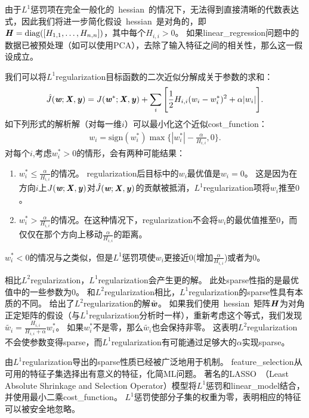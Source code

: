 由于$L^1$惩罚项在完全一般化的~\gls{hessian}~的情况下，无法得到直接清晰的代数表达式，因此我们将进一步简化假设~\gls{hessian}~是对角的，即$\boldsymbol{\mathit{H}} = \text{diag}([H_{1,1},\dots, H_{n,n}])$，其中每个$H_{i,i}>0$。
如果\gls{linear_regression}问题中的数据已被预处理（如可以使用PCA），去除了输入特征之间的相关性，那么这一假设成立。

我们可以将$L^1$\gls{regularization}目标函数的二次近似分解成关于参数的求和：
\begin{align}
 \hat J(\Vw; \MX, \Vy) = J(\Vw^*; \MX, \Vy) + \sum_i \Bigg [\frac{1}{2} H_{i,i} (w_i - w_i^*)^2 
 + \alpha |w_i| \Bigg].  %
\end{align}
如下列形式的解析解（对每一维$i$）可以最小化这个近似\gls{cost_function}：
\begin{align}
w_i = \text{sign}(w_i^*) \max\Big\{ |w_i^*| - \frac{\alpha}{H_{i,i}} , 0\Big\} .
\end{align}
对每个$i$,考虑$w_i^* > 0$的情形，会有两种可能结果：
\begin{enumerate}
\item $w_i^* \leq \frac{\alpha}{H_{i,i}}$的情况。
\gls{regularization}后目标中的$w_i$最优值是$w_i = 0$。
这是因为在方向$i$上$J(\boldsymbol{\mathit{w}}; \boldsymbol{\mathit{X}}, \boldsymbol{\mathit{y}}) $对$ \hat J(\boldsymbol{\mathit{w}}; \boldsymbol{\mathit{X}}, \boldsymbol{\mathit{y}})$的贡献被抵消，$L^1$\gls{regularization}项将$w_i$推至$0$。
\item  $w_i^* > \frac{\alpha}{H_{i,i}}$的情况。在这种情况下，\gls{regularization}不会将$w_i$的最优值推至0，而仅仅在那个方向上移动$\frac{\alpha}{H_{i,i}}$的距离。
\end{enumerate}
$w_i^* < 0$的情况与之类似，但是$L^1$惩罚项使$w_i$更接近0(增加$ \frac{\alpha}{H_{i,i}}$)或者为0。

相比$L^2$\gls{regularization}，$L^1$\gls{regularization}会产生更的解。
此处\gls{sparse}性指的是最优值中的一些参数为$0$。
和$L^2$\gls{regularization}相比，$L^1$\gls{regularization}的\gls{sparse}性具有本质的不同。
给出了$L^2$\gls{regularization}的解$\tilde {\boldsymbol{\mathit{w}}}$。 
如果我们使用~\gls{hessian}~矩阵$\boldsymbol{\mathit{H}}$为对角正定矩阵的假设（与$L^1$\gls{regularization}分析时一样），重新考虑这个等式，我们发现
$\tilde{w_i} = \frac{H_{i,i}}{H_{i,i} + \alpha} w_i^*$。
如果$w_i^*$不是零，那么$\tilde{w_i}$也会保持非零。 
这表明$L^2$\gls{regularization}不会使参数变得\gls{sparse}，而$L^1$\gls{regularization}有可能通过足够大的$\alpha$实现\gls{sparse}。
 
由$L^1$\gls{regularization}导出的\gls{sparse}性质已经被广泛地用于机制。
\gls{feature_selection}从可用的特征子集选择出有意义的特征，化简\gls{ML}问题。
著名的LASSO~\citep{Tibshirani95}（Least Absolute Shrinkage and
Selection Operator）模型将$L^1$惩罚和\gls{linear_model}结合，并使用最小二乘\gls{cost_function}。 
$L^1$惩罚使部分子集的权重为零，表明相应的特征可以被安全地忽略。
 
